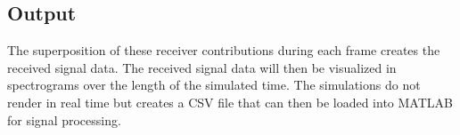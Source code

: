 \subsection{Output}
The superposition of these receiver contributions during each frame creates the received signal data. The received signal data will then be visualized in spectrograms over the length of the simulated time. The simulations do not render in real time but creates a CSV file that can then be loaded into MATLAB for signal processing.




